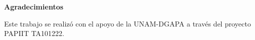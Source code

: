\pagestyle{empty}   
        \begin{flushleft}
            \begin{huge}
                \textbf{Agradecimientos}
            \end{huge}
        \end{flushleft}

        \hfill \break

        \begin{flushleft}
            Este trabajo se realizó con el apoyo de la UNAM-DGAPA a través del proyecto PAPIIT TA101222.
        \end{flushleft}
\thispagestyle{empty}



